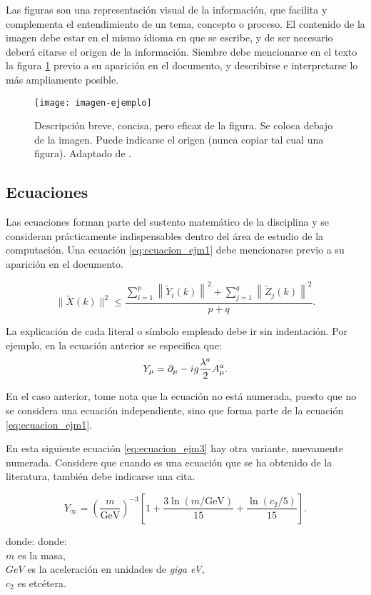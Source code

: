 Las figuras son una representación visual de la información, que facilita y complementa el entendimiento de un tema, concepto o proceso. El contenido de la imagen debe estar en el mismo idioma en que se escribe, y de ser necesario deberá citarse el origen de la información. Siembre debe mencionarse en el texto la figura \ref{fig:figuraejm} previo a su aparición en el documento, y describirse e interpretarse lo más ampliamente posible.

\begin{figure}[!ht]
\centering
\texttt{[image: imagen-ejemplo]}
\caption{Descripción breve, concisa, pero eficaz de la figura. Se coloca debajo de la imagen. Puede indicarse el origen (nunca copiar tal cual una figura). Adaptado de \citep{bib12}.}
\label{fig:figuraejm}
\end{figure}

\subsection{Ecuaciones}

Las ecuaciones forman parte del sustento matemático de la disciplina y se consideran prácticamente indispensables dentro del área de estudio de la computación. Una ecuación \ref{eq:ecuacion_ejm1} debe mencionarse previo a su aparición en el documento. 

\begin{equation}
\|\tilde{X}(k)\|^2 \leq\frac{\sum\limits_{i=1}^{p}\left\|\tilde{Y}_i(k)\right\|^2+\sum\limits_{j=1}^{q}\left\|\tilde{Z}_j(k)\right\|^2 }{p+q}.
\label{eq:ecuacion_ejm1}
\end{equation}


\noindent
La explicación de cada literal o símbolo empleado debe ir sin indentación. Por ejemplo, en la ecuación anterior se especifica que:
\begin{equation}
\notag
Y_\mu =  \partial_\mu - ig \frac{\lambda^a}{2} A^a_\mu.
\label{eq:ecuacion_ejm2}
\end{equation}

En el caso anterior, tome nota que la ecuación no está numerada, puesto que no se considera una ecuación independiente, sino que forma parte de la ecuación \ref{eq:ecuacion_ejm1}. 


En esta siguiente ecuación \ref{eq:ecuacion_ejm3} \citep{bib5} hay otra variante, nuevamente numerada. Considere que cuando es una ecuación que se ha obtenido de la literatura, también debe indicarse una cita. 

\begin{equation}
Y_\infty = \left( \frac{m}{\textrm{GeV}} \right)^{-3}
    \left[ 1 + \frac{3 \ln(m/\textrm{GeV})}{15}
    + \frac{\ln(c_2/5)}{15} \right].
\label{eq:ecuacion_ejm3}
\end{equation}

donde: 
\noindent
donde:\\
$m$ es la masa, \\
$GeV$ es la aceleración en unidades de \textit{giga eV}, \\
$c_2$ es etcétera. 
